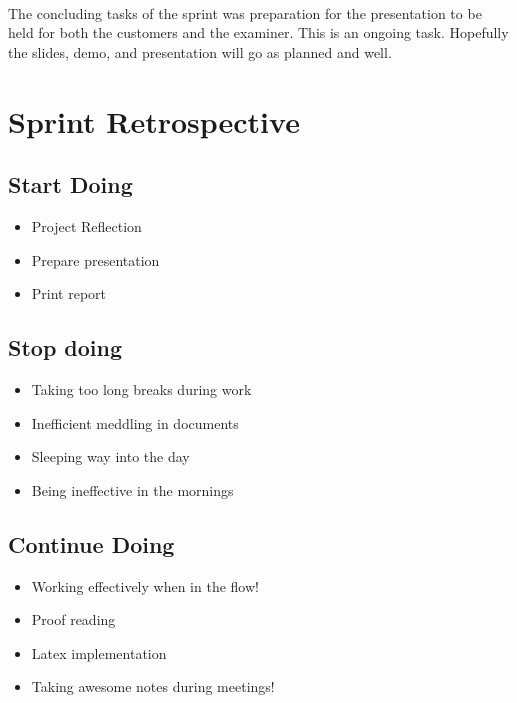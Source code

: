 \paragraph{} The concluding tasks of the sprint was preparation for the presentation to be held for both the customers and the examiner. This is an ongoing task. Hopefully the slides, demo, and presentation will go as planned and well. 


\section{Sprint Retrospective}
\label{sec:FinalRetrospective}

\subsection{Start Doing}
\begin{itemize}
\item Project Reflection
\item Prepare presentation
\item Print report
\end{itemize}

\subsection{Stop doing}
\begin{itemize}
\item Taking too long breaks during work
\item Inefficient meddling in documents
\item Sleeping way into the day
\item Being ineffective in the mornings
\end{itemize}

\subsection{Continue Doing}
\begin{itemize}
\item Working effectively when in the flow! 
\item Proof reading
\item Latex implementation
\item Taking awesome notes during meetings! 
\end{itemize}

